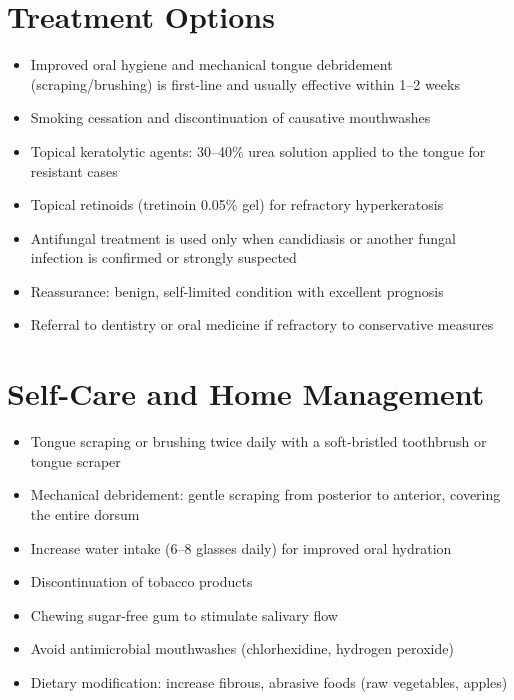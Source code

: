 \section*{Treatment Options}
\begin{itemize}
  \item Improved oral hygiene and mechanical tongue debridement (scraping/brushing) is first-line and usually effective within 1--2 weeks
  \item Smoking cessation and discontinuation of causative mouthwashes
  \item Topical keratolytic agents: 30--40\% urea solution applied to the tongue for resistant cases
  \item Topical retinoids (tretinoin 0.05\% gel) for refractory hyperkeratosis
  \item Antifungal treatment is used only when candidiasis or another fungal infection is confirmed or strongly suspected
  \item Reassurance: benign, self-limited condition with excellent prognosis
  \item Referral to dentistry or oral medicine if refractory to conservative measures
\end{itemize}

\section*{Self-Care and Home Management}
\begin{itemize}
  \item Tongue scraping or brushing twice daily with a soft-bristled toothbrush or tongue scraper
  \item Mechanical debridement: gentle scraping from posterior to anterior, covering the entire dorsum
  \item Increase water intake (6--8 glasses daily) for improved oral hydration
  \item Discontinuation of tobacco products
  \item Chewing sugar-free gum to stimulate salivary flow
  \item Avoid antimicrobial mouthwashes (chlorhexidine, hydrogen peroxide)
  \item Dietary modification: increase fibrous, abrasive foods (raw vegetables, apples)
\end{itemize}

